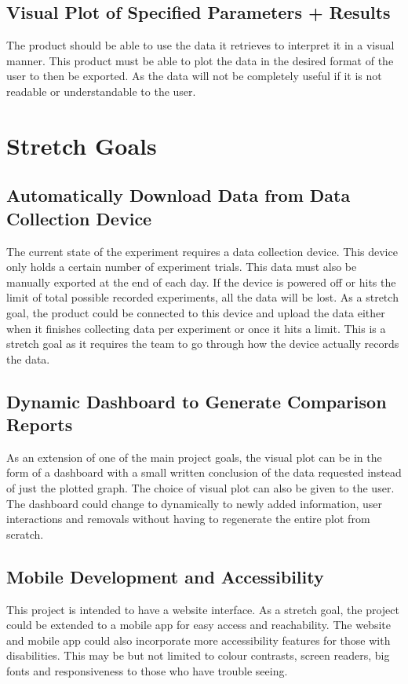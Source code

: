 \documentclass{article}
\begin{document}
\subsection*{Visual Plot of Specified Parameters + Results}
The product should be able to use the data it retrieves to interpret it in a visual manner.
This product must be able to plot the data in the desired format of the user to then be exported.
As the data will not be completely useful if it is not readable or understandable to the user.

\section{Stretch Goals}
\subsection*{Automatically Download Data from Data Collection Device}
The current state of the experiment requires a data collection device. This device only holds a certain number of experiment trials.
This data must also be manually exported at the end of each day. If the device is powered off or hits the limit of total possible recorded experiments, all the data will be lost.
As a stretch goal, the product could be connected to this device and upload the data either when it finishes collecting data per experiment or once it hits a limit.
This is a stretch goal as it requires the team to go through how the device actually records the data.


\subsection*{Dynamic Dashboard to Generate Comparison Reports}
As an extension of one of the main project goals, the visual plot can be in the form of a dashboard with a small written conclusion of the data requested instead of just the plotted graph.
The choice of visual plot can also be given to the user. The dashboard could change to dynamically to newly added information, user interactions and removals
without having to regenerate the entire plot from scratch.  


\subsection*{Mobile Development and Accessibility}
This project is intended to have a website interface. As a stretch goal, the project could be extended to a mobile app for
easy access and reachability. The website and mobile app could also incorporate more accessibility features for those with disabilities.
This may be but not limited to colour contrasts, screen readers, big fonts and responsiveness to those who have trouble seeing.
 
\end{document}

